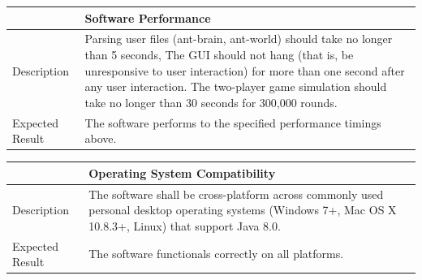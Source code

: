 \documentclass[11pt]{article}
\begin{document}
\begin{longtable}[c]{@{}p{}p{}@{}}
\toprule
& Software Performance \tabularnewline
\midrule
Description & Parsing user files (ant-brain, ant-world) should take
no longer than 5 seconds, The GUI should not hang (that is, be
unresponsive to user interaction) for more than one second after any
user interaction. The two-player game simulation should take no longer
than 30 seconds for 300,000 rounds. \tabularnewline
Expected Result & The software performs to the specified performance
timings above. \tabularnewline
\bottomrule
\end{longtable}

\begin{longtable}[c]{@{}p{}p{}@{}}
\toprule
& Operating System Compatibility \tabularnewline
\midrule
Description & The software shall be cross-platform across commonly
used personal desktop operating systems (Windows 7+, Mac OS X 10.8.3+,
Linux) that support Java 8.0. \tabularnewline
Expected Result & The software functionals correctly on all platforms.\tabularnewline
\bottomrule
\end{longtable}
\end{document}

